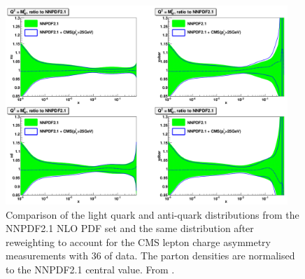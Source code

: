 \begin{figure}[htbp]
  \begin{center}
  \includegraphics*[width=0.95\textwidth]{effect}
  \caption[Comparison of the light quark and anti-quark distributions from the
NNPDF2.1 NLO PDF set and the same distribution after reweighting to account for
the CMS lepton charge asymmetry measurements with \unit{36}{\invpb} of data.]
{Comparison of the light quark and anti-quark distributions from the NNPDF2.1
NLO PDF set and the same distribution after reweighting to account for the CMS
lepton charge asymmetry measurements with \unit{36}{\invpb} of data.  The parton
densities are normalised to the NNPDF2.1 central value.  From
\cite{Ball:2011gg}. } \label{fig:effect}
  \end{center}
\end{figure}


